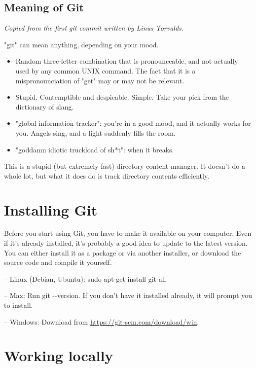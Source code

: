 \documentclass[12pt,a4]{article}
\newcommand{\ilcode}[1]{\textcolor[RGB]{160, 110, 220}{#1}}
\begin{document}
\subsection{Meaning of Git}
\vspace*{-10pt}
\emph{Copied from the first git commit written by Linus Torvalds.}

"git" can mean anything, depending on your mood.
\begin{itemize}
\vspace*{-10pt}
\item Random three-letter combination that is pronounceable, and not actually
	used by any common UNIX command. The fact that it is a mispronounciation of
	"get" may or may not be relevant.
\vspace*{-3pt}
\item Stupid. Contemptible and despicable. Simple. Take your pick from the
	dictionary of slang.
\vspace*{-3pt}
\item "global information tracker": you're in a good mood, and it actually
   works for you. Angels sing, and a light suddenly fills the room.
\vspace*{-3pt}
\item "goddamn idiotic truckload of sh*t": when it breaks.
\vspace*{-10pt}
\end{itemize}

This is a stupid (but extremely fast) directory content manager. It doesn't do
a whole lot, but what it does do is track directory contents efficiently.

\section{Installing Git}
Before you start using Git, you have to make it available on your computer. Even
if it’s already installed, it’s probably a good idea to update to the latest
version. You can either install it as a package or via another installer, or
download the source code and compile it yourself.

{\sf -- Linux (Debian, Ubuntu):} \ilcode{sudo apt-get install git-all}

{\sf -- Max:} Run \ilcode{git -{}-version}. If you don’t have it installed
already, it will prompt you to install.

{\sf -- Windows:} Download from \url{https://git-scm.com/download/win}.

\section{Working locally}
\end{document}
